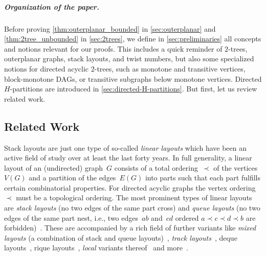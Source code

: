 \documentclass{article}
\begin{document}
\subparagraph{Organization of the paper.}
Before proving \cref{thm:outerplanar_bounded} in \cref{sec:outerplanar} and \cref{thm:2tree_unbounded} in \cref{sec:2trees}, we define in \cref{sec:preliminaries} all concepts and notions relevant for our proofs.
This includes a quick reminder of $2$-trees, outerplanar graphs, stack layouts, and twist numbers, but also some specialized notions for directed acyclic $2$-trees, such as monotone and transitive vertices, block-monotone DAGs, or transitive subgraphs below monotone vertices.
Directed $H$-partitions are introduced in \cref{sec:directed-H-partitions}.
But first, let us review related work.

\subsection{Related Work}
\label{sec:related_work}

Stack layouts are just one type of so-called \emph{linear layouts} which have been an active field of study over at least the last forty years.
In full generality, a linear layout of an (undirected) graph~$G$ consists of a total ordering~$\prec$ of the vertices~$V(G)$ and a partition of the edges~$E(G)$ into parts such that each part fulfills certain combinatorial properties.
For directed acyclic graphs the vertex ordering~$\prec$ must be a topological ordering.
The most prominent types of linear layouts are \emph{stack layouts} (no two edges of the same part cross) and \emph{queue layouts} (no two edges of the same part nest, i.e., two edges~$ab$ and~$cd$ ordered $a \prec c \prec d \prec b$ are forbidden)~\cite{Heath1992_Queues,Heath1992_Comparing,Dujmovic2020_PlanarGraphsBoundedQueueNumber}.
These are accompanied by a rich field of further variants like \emph{mixed layouts} (a combination of stack and queue layouts)~\cite{Heath1992_Queues,Pupyrev2017_MixedLayoutPlanar,Angelini2022_MixedLayouts2Trees,Alam2022_MixedPageNumber,deCol2019_MixedLinearLayours,Foerster2023_BipartiteLinearLayouts}, \emph{track layouts}~\cite{Dujmovic2005_TrackLayouts,Bannister2019_TrackLayouts,Pupyrev2020_TrackNumber}, deque layouts~\cite{Auer2011_QueueDequeGraphs,Bekos2023_ComputeLinearLayouts,Bekos2023_DequeRiqueComplete}, rique layouts~\cite{Bekos2023_RiqueNumber,Bekos2023_ComputeLinearLayouts,Bekos2023_DequeRiqueComplete}, \emph{local} variants thereof~\cite{Merker2019_LocalStack,Merker2020_LocalQueue,Merker2021_LocalComplete,Angelini2022_MixedLayouts2Trees} and more~\cite{Dujmovic2004_LinearLayouts,Alam2021_DispersableBookEmbeddings}.
\end{document}
